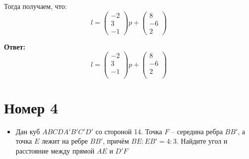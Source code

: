 \documentclass[a4paper,12pt]{article}
\begin{document}
Тогда получаем, что:
\[
l = \begin{pmatrix}
-2 \\ 3 \\ -1 
\end{pmatrix}p + \begin{pmatrix}
8 \\ -6 \\ 2
\end{pmatrix}
\]
{\Large \begin{center}
\textbf{Ответ: } 
\[
l = \begin{pmatrix}
-2 \\ 3 \\ -1 \\
\end{pmatrix}p + \begin{pmatrix}
8 \\ -6 \\ 2 \\
\end{pmatrix}
\]
\end{center}}
\clearpage
\section*{Номер 4}
\begin{itemize}
\item
\begin{center}
Дан куб $ABCDA'B'C'D'$ со стороной 14. Точка $F$ -- середина ребра $BB'$, а точка $E$ лежит на ребре $BB'$, причём $BE : EB' = 4 : 3$. Найдите угол и расстояние между прямой $AE$ и $D'F$
\end{center}
\end{itemize}
\end{document}
